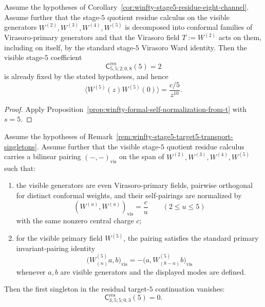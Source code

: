 \begin{proposition}
\label{prop:winfty-stage5-visible-w5-normalization}
Assume the hypotheses of
Corollary~\ref{cor:winfty-stage5-residue-eight-channel}. Assume
further that the stage-$5$ quotient residue calculus on the visible
generators $W^{(2)},W^{(3)},W^{(4)},W^{(5)}$ is decomposed into
conformal families of Virasoro-primary generators and that the
Virasoro field $T:=W^{(2)}$ acts on them, including on itself, by the
standard stage-$5$ Virasoro Ward identity. Then the visible stage-$5$
coefficient
\[
\mathsf{C}^{\mathrm{res}}_{5,5;2;0,8}(5)=2
\]
is already fixed by the stated hypotheses, and hence
\[
\langle W^{(5)}(z)W^{(5)}(0)\rangle=\frac{c/5}{z^{10}}.
\]
\end{proposition}

\begin{proof}
Apply Proposition~\ref{prop:winfty-formal-self-normalization-from-t} with $s=5$.
\end{proof}

\begin{proposition}
\label{prop:winfty-stage5-target5-pole3-pairing-vanishing}
Assume the hypotheses of
Remark~\ref{rem:winfty-stage5-target5-transport-singletons}.
Assume further that the visible stage-$5$ quotient residue calculus
carries a bilinear pairing \((-, -)_{\mathrm{vis}}\) on the span of
\(W^{(2)},W^{(3)},W^{(4)},W^{(5)}\) such that:
\begin{enumerate}[label=\textup{(\roman*)}]
\item the visible generators are even Virasoro-primary fields,
 pairwise orthogonal for distinct conformal weights, and their
 self-pairings are normalized by
 \[
 (W^{(u)},W^{(u)})_{\mathrm{vis}}=\frac{c}{u}
 \qquad (2\le u\le 5)
 \]
 with the same nonzero central charge \(c\);
\item for the visible primary field \(W^{(5)}\), the pairing satisfies
 the standard primary invariant-pairing identity
 \[
 \bigl(W^{(5)}_{(n)}a,b\bigr)_{\mathrm{vis}}
 =
 -\bigl(a,W^{(5)}_{(8-n)}b\bigr)_{\mathrm{vis}}
 \]
 whenever \(a,b\) are visible generators and the displayed modes are
 defined.
\end{enumerate}
Then the first singleton in the residual target-$5$ continuation
vanishes:
\[
\mathsf{C}^{\mathrm{res}}_{3,5;5;0,3}(5)=0.
\]
\end{proposition}

